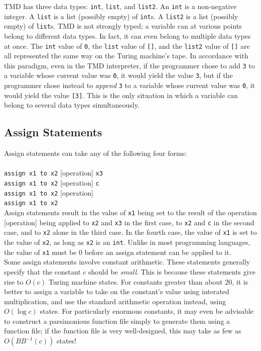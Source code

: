 \documentclass[11pt]{report}
\begin{document}
TMD has three data types: \texttt{int}, \texttt{list}, and \texttt{list2}. An \texttt{int} is a non-negative integer. A \texttt{list} is a list (possibly empty) of \texttt{int}s. A \texttt{list2} is a list (possibly empty) of \texttt{list}s. TMD is not strongly typed; a variable can at various points belong to different data types. In fact, it can even belong to multiple data types at once. The \texttt{int} value of \texttt{0}, the \texttt{list} value of \texttt{[]}, and the \texttt{list2} value of \texttt{[]} are all represented the same way on the Turing machine's tape. In accordance with this paradigm, even in the TMD interpreter, if the programmer chose to add \texttt{3} to a variable whose current value was \texttt{0}, it would yield the value \texttt{3}, but if the programmer chose instead to \emph{append} \texttt{3} to a variable whose current value was \texttt{0}, it would yield the value \texttt{[3]}. This is the only situation in which a variable can belong to several data types simultaneously.

\subsection{Assign Statements}

Assign statements can take any of the following four forms: \\ \\
\texttt{assign x1 to x2} [operation] \texttt{x3} \\ 
\texttt{assign x1 to x2} [operation] \texttt{c} \\
\texttt{assign x1 to x2} [operation] \\
\texttt{assign x1 to x2} \\

Assign statements result in the value of \texttt{x1} being set to the result of the operation [operation] being applied to \texttt{x2} and \texttt{x3} in the first case, to \texttt{x2} and \texttt{c} in the second case, and to \texttt{x2} alone in the third case. In the fourth case, the value of \texttt{x1} is set to the value of \texttt{x2}, as long as \texttt{x2} is an \texttt{int}. Unlike in most programming languages, the value of \texttt{x1} must be 0 before an assign statement can be applied to it. \\

Some assign statements involve constant arithmetic. These statements generally specify that the constant $c$ should be \emph{small}. This is because these statements give rise to $O(c)$ Turing machine states. For constants greater than about 20, it is better to assign a variable to take on the constant's value using interated multiplication, and use the standard arithmetic operation instead, using $O(\log c)$ states. For particularly enormous constants, it may even be advisable to construct a parsimonious function file simply to generate them using a function file; if the function file is very well-designed, this may take as few as $O(BB^{-1}(c))$ states! \\
\end{document}
